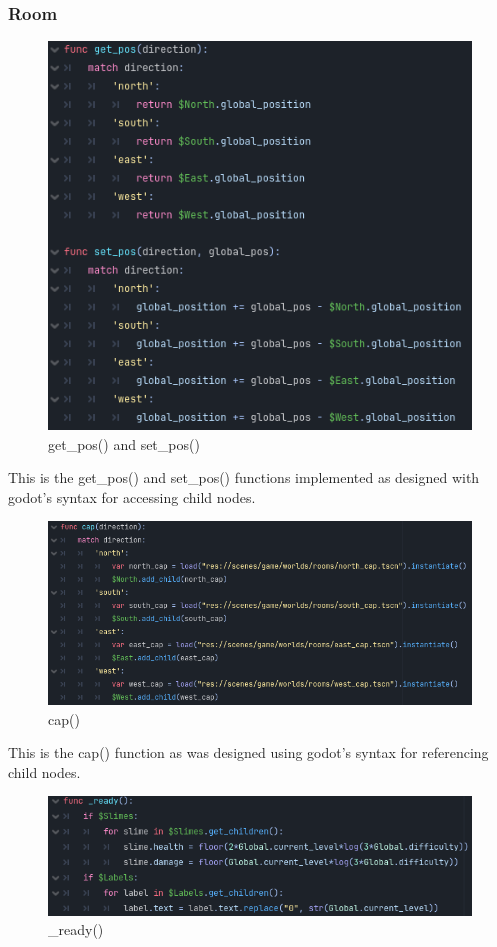 \documentclass{article}
\begin{document}
        \subsubsection{Room}
        \begin{figure}[H]
                \centering
                \includegraphics[width = 0.8\columnwidth]{images/development/Room_pos.PNG}
                \caption{get\_pos() and set\_pos()}
        \end{figure}
        This is the get\_pos() and set\_pos() functions implemented as designed with godot's syntax for accessing child nodes.
        \begin{figure}[H]
                \centering
                \includegraphics[width = 0.8\columnwidth]{images/development/Room_cap.PNG}
                \caption{cap()}
        \end{figure}
        This is the cap() function as was designed using godot's syntax for referencing child nodes.\\
        \begin{figure}[H]
                \centering
                \includegraphics[width = 0.8\columnwidth]{images/development/Room_ready.PNG}
                \caption{\_ready()}
        \end{figure}
\end{document}
